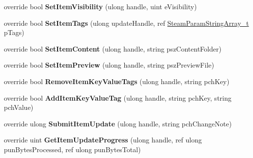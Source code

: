 \begin{DoxyCompactItemize}
\item 
\hypertarget{classValve_1_1Steamworks_1_1CSteamUGC_a30d10e73fe3f5badd45e36561bee870d}{}override bool {\bfseries Set\+Item\+Visibility} (ulong handle, uint e\+Visibility)\label{classValve_1_1Steamworks_1_1CSteamUGC_a30d10e73fe3f5badd45e36561bee870d}

\item 
\hypertarget{classValve_1_1Steamworks_1_1CSteamUGC_a3eeed8139de380e8a5981029fd831dff}{}override bool {\bfseries Set\+Item\+Tags} (ulong update\+Handle, ref \hyperlink{structValve_1_1Steamworks_1_1SteamParamStringArray__t}{Steam\+Param\+String\+Array\+\_\+t} p\+Tags)\label{classValve_1_1Steamworks_1_1CSteamUGC_a3eeed8139de380e8a5981029fd831dff}

\item 
\hypertarget{classValve_1_1Steamworks_1_1CSteamUGC_a75aa6f8101b76f8b9256acfd3d3b0340}{}override bool {\bfseries Set\+Item\+Content} (ulong handle, string psz\+Content\+Folder)\label{classValve_1_1Steamworks_1_1CSteamUGC_a75aa6f8101b76f8b9256acfd3d3b0340}

\item 
\hypertarget{classValve_1_1Steamworks_1_1CSteamUGC_a970bb206a3503f5eec508b5537cd4238}{}override bool {\bfseries Set\+Item\+Preview} (ulong handle, string psz\+Preview\+File)\label{classValve_1_1Steamworks_1_1CSteamUGC_a970bb206a3503f5eec508b5537cd4238}

\item 
\hypertarget{classValve_1_1Steamworks_1_1CSteamUGC_aa90a2ce1214eba238bffff3e39b50898}{}override bool {\bfseries Remove\+Item\+Key\+Value\+Tags} (ulong handle, string pch\+Key)\label{classValve_1_1Steamworks_1_1CSteamUGC_aa90a2ce1214eba238bffff3e39b50898}

\item 
\hypertarget{classValve_1_1Steamworks_1_1CSteamUGC_a43a7178b04fbc08e6dc53c607131f687}{}override bool {\bfseries Add\+Item\+Key\+Value\+Tag} (ulong handle, string pch\+Key, string pch\+Value)\label{classValve_1_1Steamworks_1_1CSteamUGC_a43a7178b04fbc08e6dc53c607131f687}

\item 
\hypertarget{classValve_1_1Steamworks_1_1CSteamUGC_a7c604866c9e692cd21cf117fc5a57bbf}{}override ulong {\bfseries Submit\+Item\+Update} (ulong handle, string pch\+Change\+Note)\label{classValve_1_1Steamworks_1_1CSteamUGC_a7c604866c9e692cd21cf117fc5a57bbf}

\item 
\hypertarget{classValve_1_1Steamworks_1_1CSteamUGC_a0648cb8e379cc170a9c22d51c7a52bf6}{}override uint {\bfseries Get\+Item\+Update\+Progress} (ulong handle, ref ulong pun\+Bytes\+Processed, ref ulong pun\+Bytes\+Total)\label{classValve_1_1Steamworks_1_1CSteamUGC_a0648cb8e379cc170a9c22d51c7a52bf6}


\end{DoxyCompactItemize}
